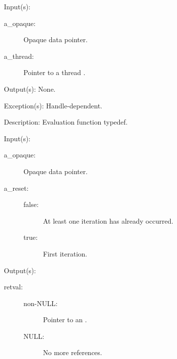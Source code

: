 \begin{capi}
\label{cw_nxo_handle_eval_t}
	\begin{capilist}
	\item[Input(s): ]
		\begin{description}\item[]
		\item[a\_opaque: ]
			Opaque data pointer.
		\item[a\_thread: ]
			Pointer to a thread .
		\end{description}
	\item[Output(s): ] None.
	\item[Exception(s): ] Handle-dependent.
	\item[Description: ]
		Evaluation function typedef.
	\end{capilist}
\label{cw_nxo_handle_ref_iter_t}
	\begin{capilist}
	\item[Input(s): ]
		\begin{description}\item[]
		\item[a\_opaque: ]
			Opaque data pointer.
		\item[a\_reset: ]
			\begin{description}\item[]
			\item[false: ]
				At least one iteration has already occurred.
			\item[true: ]
				First iteration.
			\end{description}
		\end{description}
	\item[Output(s): ]
		\begin{description}\item[]
		\item[retval: ]
			\begin{description}\item[]
			\item[non-NULL: ]
				Pointer to an \classname{nxoe}.
			\item[NULL: ]
				No more references.
			\end{description}
		\end{description}

\end{capilist}
\end{capi}
